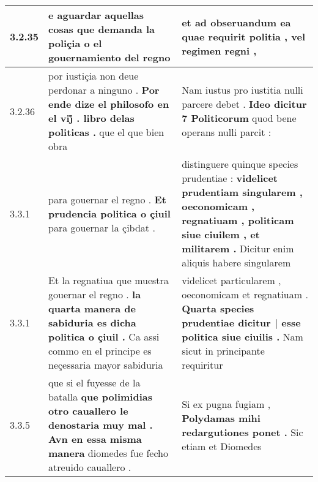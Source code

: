 \begin{tabular}{|p{1cm}|p{6.5cm}|p{6.5cm}|}
3.2.35 & e aguardar aquellas cosas \textbf{ que demanda la poliçia } o el gouernamiento del regno & et ad obseruandum \textbf{ ea quae requirit politia , } vel regimen regni , \\\hline
3.2.36 & por iustiçia non deue perdonar a ninguno . \textbf{ Por ende dize el philosofo en el vij̊ . libro delas politicas . } que el que bien obra & Nam iustus pro iustitia nulli parcere debet . \textbf{ Ideo dicitur 7 Politicorum } quod bene operans nulli parcit : \\\hline
3.3.1 & para gouernar el regno . \textbf{ Et prudencia politica o çiuil } para gouernar la çibdat . & distinguere quinque species prudentiae : \textbf{ videlicet prudentiam singularem , oeconomicam , regnatiuam , politicam siue ciuilem , et militarem . } Dicitur enim aliquis habere singularem \\\hline
3.3.1 & Et la regnatiua que muestra gouernar el regno . \textbf{ la quarta manera de sabiduria es dicha politica o çiuil . } Ca assi commo en el principe es neçessaria mayor sabiduria & videlicet particularem , oeconomicam et regnatiuam . \textbf{ Quarta species prudentiae dicitur | esse politica siue ciuilis . } Nam sicut in principante requiritur \\\hline
3.3.5 & que si el fuyesse de la batalla \textbf{ que polimidias otro cauallero le denostaria muy mal . Avn en essa misma manera } diomedes fue fecho atreuido cauallero . & Si ex pugna fugiam , \textbf{ Polydamas mihi redargutiones ponet . } Sic etiam et Diomedes \\\hline

\end{tabular}
